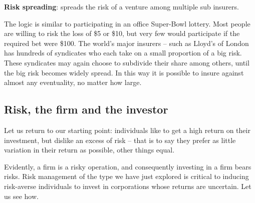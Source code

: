 \begin{DefBox}
\textbf{Risk spreading}: spreads the risk of a venture among multiple sub insurers.
\end{DefBox}

The logic is similar to participating in an office Super-Bowl lottery. Most people are willing to risk the loss of \$5 or \$10, but very few would participate if the required bet were \$100. The world's major insurers -- such as Lloyd's of London has hundreds of syndicates who each take on a small proportion of a big risk. These syndicates may again choose to subdivide their share among others, until the big risk becomes widely spread. In this way it is possible to insure against almost any eventuality, no matter how large. 

\subsection*{Risk, the firm and the investor}

Let us return to our starting point: individuals like to get a high return on their investment, but dislike an excess of risk -- that is to say they prefer as little variation in their return as possible, other things equal. 

Evidently, a firm is a risky operation, and consequently investing in a firm bears risks. Risk management of the type we have just explored is critical to inducing risk-averse individuals to invest in corporations whose returns are uncertain. Let us see how.